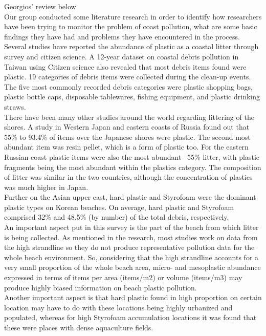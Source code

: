 \documentclass[10pt]{article}\usepackage[]{graphicx}\usepackage[]{color}
\begin{document}
Georgios' review below\\

Our group conducted some literature research in order to identify how researchers have been trying to monitor the problem of coast pollution, what are some basic findings they have had and problems they have encountered in the process.\\

Several studies have reported the abundance of plastic as a coastal litter through survey and citizen science. A 12-year dataset on coastal debris pollution in Taiwan using Citizen science also revealed that most debris items found were plastic. \cite{WALTHER2018} 19 categories of debris items were collected during the clean-up events. The five most commonly recorded debris categories were plastic shopping bags, plastic bottle caps, disposable tablewares, fishing equipment, and plastic drinking straws. \\

There have been many other studies around the world regarding littering of the shores. A study in Western Japan and eastern coasts of Russia found out that 55\% to 93.4\% of items over the Japanese shores were plastic. The second most abundant item was resin pellet, which is a form of plastic too. For the eastern Russian coast plastic items were also the most abundant ~55\% litter, with plastic fragments being the most abundant within the plastics category. The composition of litter was similar in the two countries, although the concentration of plastics was much higher in Japan. \cite{KUSUI2003} \\

Further on the Asian upper east, hard plastic and Styrofoam were the dominant plastic types on Korean beaches. On average, hard plastic and Styrofoam comprised 32\% and 48.5\% (by number) of the total debris, respectively. \\
An important aspect put in this survey is the part of the beach from which litter is being collected. As mentioned in the research, most studies work on data from the high strandline so they do not produce representative pollution data for the whole beach environment.  So, considering that the high strandline accounts for a very small proportion of the whole beach area, micro- and mesoplastic abundance expressed in terms of items per area (items/m2) or volume (items/m3) may produce highly biased information on beach plastic pollution.\\
Another important aspect is that hard plastic found in high proportion on certain location may have to do with these locations being highly urbanized and populated, whereas for high Styrofoam accumulation locations it was found that these were places with dense aquaculture fields.
\cite{LEE2017} \\
\end{document}
